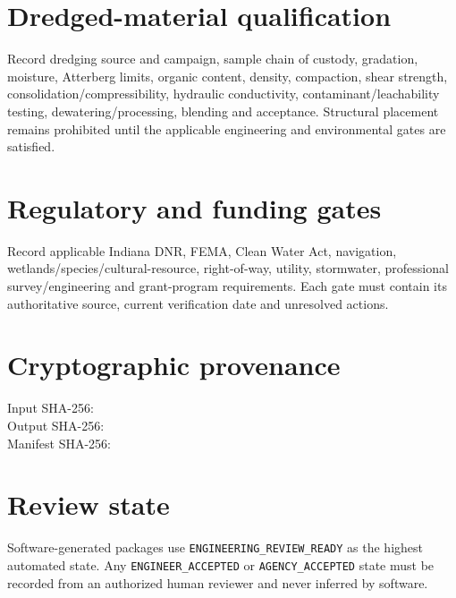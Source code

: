 \documentclass[11pt]{article}
\begin{document}
\section{Dredged-material qualification}
Record dredging source and campaign, sample chain of custody, gradation, moisture, Atterberg limits, organic content, density, compaction, shear strength, consolidation/compressibility, hydraulic conductivity, contaminant/leachability testing, dewatering/processing, blending and acceptance. Structural placement remains prohibited until the applicable engineering and environmental gates are satisfied.

\section{Regulatory and funding gates}
Record applicable Indiana DNR, FEMA, Clean Water Act, navigation, wetlands/species/cultural-resource, right-of-way, utility, stormwater, professional survey/engineering and grant-program requirements. Each gate must contain its authoritative source, current verification date and unresolved actions.

\section{Cryptographic provenance}
Input SHA-256: \texttt{}\\
Output SHA-256: \texttt{}\\
Manifest SHA-256: \texttt{}

\section{Review state}
Software-generated packages use \texttt{ENGINEERING\_REVIEW\_READY} as the highest automated state. Any \texttt{ENGINEER\_ACCEPTED} or \texttt{AGENCY\_ACCEPTED} state must be recorded from an authorized human reviewer and never inferred by software.
\end{document}
